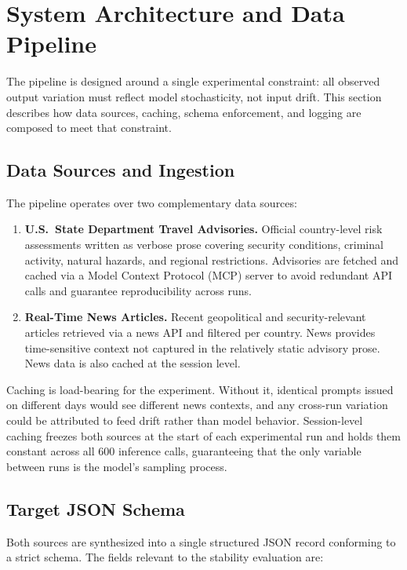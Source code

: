 \documentclass[sigconf]{acmart}
\begin{document}
\section{System Architecture and Data Pipeline}
\label{sec:architecture}

The pipeline is designed around a single experimental constraint: all observed output variation must reflect model stochasticity, not input drift. This section describes how data sources, caching, schema enforcement, and logging are composed to meet that constraint.

\subsection{Data Sources and Ingestion}

The pipeline operates over two complementary data sources:

\begin{enumerate}
  \item \textbf{U.S.\ State Department Travel Advisories.} Official country-level risk assessments written as verbose prose covering security conditions, criminal activity, natural hazards, and regional restrictions. Advisories are fetched and cached via a Model Context Protocol (MCP) server to avoid redundant API calls and guarantee reproducibility across runs.

  \item \textbf{Real-Time News Articles.} Recent geopolitical and security-relevant articles retrieved via a news API and filtered per country. News provides time-sensitive context not captured in the relatively static advisory prose. News data is also cached at the session level.
\end{enumerate}

Caching is load-bearing for the experiment. Without it, identical prompts issued on different days would see different news contexts, and any cross-run variation could be attributed to feed drift rather than model behavior. Session-level caching freezes both sources at the start of each experimental run and holds them constant across all 600 inference calls, guaranteeing that the only variable between runs is the model's sampling process.

\subsection{Target JSON Schema}

Both sources are synthesized into a single structured JSON record conforming to a strict schema. The fields relevant to the stability evaluation are:
\end{document}
